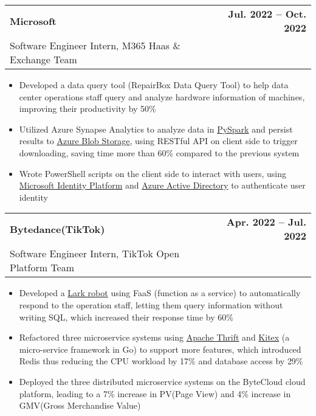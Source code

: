 \documentclass[letterpaper,11pt]{article}
\makeatletter
\newcommand{\resumeItem}[1]{
  \item\small{
    {#1 \vspace{-2pt}}
  }
}
\newcommand{\resumeSubheading}[4]{
  \vspace{-2pt}\item
    \begin{tabular*}{1.0\textwidth}[t]{l@{\extracolsep{\fill}}r}
      \textbf{#1} & \textbf{\small #2} \\
      {\small#3} & \textit{\small #4} \\
    \end{tabular*}\vspace{-7pt}
}
\newcommand{\resumeItemListStart}{\begin{itemize}}
\newcommand{\resumeItemListEnd}{\end{itemize}\vspace{-5pt}}
\makeatother
\begin{document}
    \resumeSubheading
      {Microsoft}
      {Jul. 2022 -- Oct. 2022}
      {Software Engineer Intern, M365 Haas \& Exchange Team}
      {}
      \resumeItemListStart
        \resumeItem{Developed a data query tool (RepairBox Data Query Tool) to help data center operations staff query and analyze hardware information of machines, improving their productivity by 50\%}
        \resumeItem{Utilized {Azure Synapse Analytics} to analyze data in \href{https://spark.apache.org/}{PySpark} and persist results to \href{https://azure.microsoft.com/en-us/services/storage/blobs/}{Azure Blob Storage}, using RESTful API on client side to trigger downloading, saving time more than 60\% compared to the previous system}
        \resumeItem{Wrote {PowerShell} scripts on the client side to interact with users, using \href{https://docs.microsoft.com/en-us/azure/active-directory/develop/}{Microsoft Identity Platform} and \href{https://azure.microsoft.com/en-us/services/active-directory/\#overview}{Azure Active Directory} to authenticate user identity}
    \resumeItemListEnd
    

    \resumeSubheading
      {Bytedance(TikTok)}
      {Apr. 2022 -- Jul. 2022}
      {Software Engineer Intern, TikTok Open Platform Team}
      {}
      \resumeItemListStart
        \resumeItem{Developed a \href{https://open.larksuite.com/}{Lark robot} using {FaaS} (function as a service) to automatically respond to the operation staff, letting them query information without writing {SQL}, which increased their response time by 60\%}
        \resumeItem{Refactored three microservice systems using \href{https://thrift.apache.org/}{Apache Thrift} and \href{https://github.com/cloudwego/kitex}{Kitex} (a micro-service framework in {Go}) to support more features, which introduced {Redis} thus reducing the CPU workload by {17\%} and database access by {29\%}}
        \resumeItem{Deployed the three distributed microservice systems on the ByteCloud cloud platform, leading to a {7\%} increase in {PV}(Page View) and {4\%} increase in {GMV}(Gross Merchandise Value)}
      \resumeItemListEnd
    

    
\end{document}
